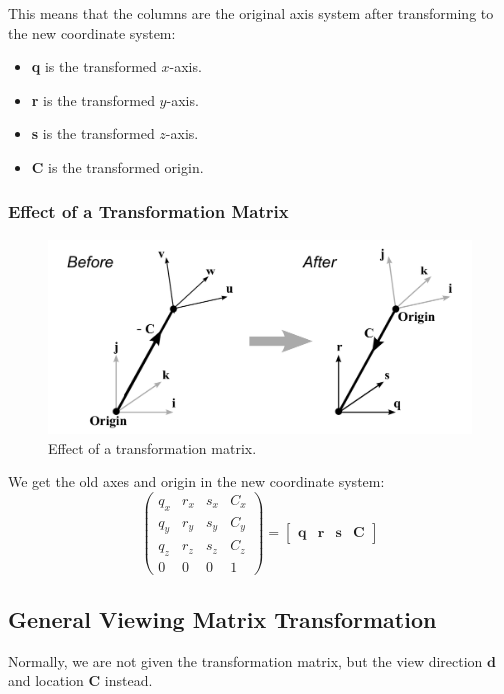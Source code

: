 \documentclass[11pt]{article}
\begin{document}
This means that the columns are the original axis system after transforming to the new coordinate system:
\begin{itemize}
  \item \textbf{q} is the transformed $x$-axis.
  \item \textbf{r} is the transformed $y$-axis.
  \item \textbf{s} is the transformed $z$-axis.
  \item \textbf{C} is the transformed origin.
\end{itemize}

\subsubsection{Effect of a Transformation Matrix}
\begin{figure}[htb!]
  \caption{Effect of a transformation matrix.}
  \includegraphics[scale=0.2]{effecttransform}
  \centering
\end{figure}

We get the old axes and origin in the new coordinate system:
\[
  \begin{pmatrix}
    q_x & r_x & s_x & C_x \\
    q_y & r_y & s_y & C_y \\
    q_z & r_z & s_z & C_z \\
    0 & 0 & 0 & 1
  \end{pmatrix}
  =
  \begin{bmatrix} \textbf{q} & \textbf{r} & \textbf{s} & \textbf{C} \end{bmatrix}
\]

\subsection{General Viewing Matrix Transformation}
Normally, we are not given the transformation matrix, but the view direction $\textbf{d}$ and location $\textbf{C}$ instead.
\end{document}
